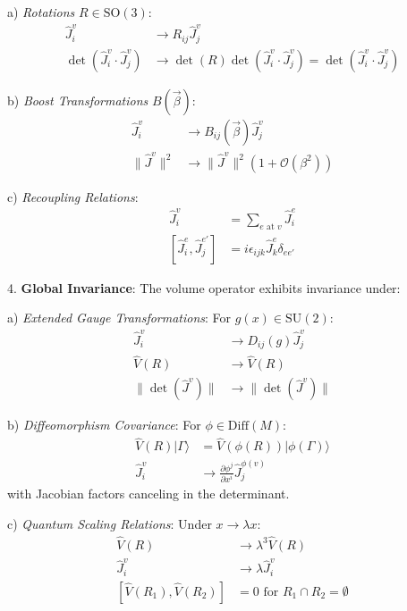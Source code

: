 \documentclass[12pt,a4paper]{article}
\begin{document}
   a) \textit{Rotations} $R \in \text{SO}(3)$:
      \[
      \begin{aligned}
      \hat{J}_i^v &\rightarrow R_{ij}\hat{J}_j^v \\
      \det(\hat{J}_i^v \cdot \hat{J}_j^v) &\rightarrow \det(R)\det(\hat{J}_i^v \cdot \hat{J}_j^v) = \det(\hat{J}_i^v \cdot \hat{J}_j^v)
      \end{aligned}
      \]
   
   b) \textit{Boost Transformations} $B(\vec{\beta})$:
      \[
      \begin{aligned}
      \hat{J}_i^v &\rightarrow B_{ij}(\vec{\beta})\hat{J}_j^v \\
      \|\hat{J}^v\|^2 &\rightarrow \|\hat{J}^v\|^2(1 + \mathcal{O}(\beta^2))
      \end{aligned}
      \]
   
   c) \textit{Recoupling Relations}:
      \[
      \begin{aligned}
      \hat{J}_i^v &= \sum_{e \text{ at } v} \hat{J}_i^e \\
      [\hat{J}_i^e, \hat{J}_j^{e'}] &= i\epsilon_{ijk}\hat{J}_k^e\delta_{ee'}
      \end{aligned}
      \]

4. \textbf{Global Invariance}:
   The volume operator exhibits invariance under:
   
   a) \textit{Extended Gauge Transformations}:
      For $g(x) \in \text{SU}(2)$:
      \[
      \begin{aligned}
      \hat{J}_i^v &\rightarrow D_{ij}(g)\hat{J}_j^v \\
      \hat{V}(R) &\rightarrow \hat{V}(R) \\
      \|\det(\hat{J}^v)\| &\rightarrow \|\det(\hat{J}^v)\|
      \end{aligned}
      \]
   
   b) \textit{Diffeomorphism Covariance}:
      For $\phi \in \text{Diff}(M)$:
      \[
      \begin{aligned}
      \hat{V}(R)|\Gamma\rangle &= \hat{V}(\phi(R))|\phi(\Gamma)\rangle \\
      \hat{J}_i^v &\rightarrow \frac{\partial \phi^j}{\partial x^i}\hat{J}_j^{\phi(v)}
      \end{aligned}
      \]
      with Jacobian factors canceling in the determinant.
   
   c) \textit{Quantum Scaling Relations}:
      Under $x \rightarrow \lambda x$:
      \[
      \begin{aligned}
      \hat{V}(R) &\rightarrow \lambda^3\hat{V}(R) \\
      \hat{J}_i^v &\rightarrow \lambda\hat{J}_i^v \\
      [\hat{V}(R_1), \hat{V}(R_2)] &= 0 \text{ for } R_1 \cap R_2 = \emptyset
      \end{aligned}
      \]
   
\end{document}
